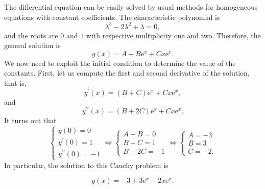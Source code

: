 \documentclass[a4paper,10 pt]{report}
\newcommand{\finalanswer}[1]{%
    \begin{finalAnswer}
    \[
        #1
    \]
    \end{finalAnswer}
}
\theoremstyle{definition}
\begin{document}
\begin{solutionBox} The differential equation can be easily solved by usual methods for homogeneous equations with constant coefficients. The characteristic polynomial is
\begin{equation*}\lambda^3 - 2 \lambda^2 + \lambda = 0, \end{equation*}
and the roots are $0$ and $1$ with respective multiplicity one and two. Therefore, the general solution is
\begin{equation*}y(x) = A + B\mathrm{e}^x + C x \mathrm{e}^x. \end{equation*}
We now need to exploit the initial condition to determine the value of the constants. First, let us compute the first and second derivative of the solution, that is,
\begin{equation*}y^\prime(x) = (B + C)\mathrm{e}^x + C x \mathrm{e}^x, \end{equation*}
and
\begin{equation*}y^{\prime \prime}(x) = (B + 2C) \mathrm{e}^x + C x \mathrm{e}^x. \end{equation*}
It turns out that
\begin{equation*} \begin{cases} y(0) = 0 \\ y^\prime(0) = 1 \\ y^{\prime \prime}(0) = - 1 \end{cases} \iff \begin{cases} A + B = 0 \\ B + C = 1 \\ B + 2C = - 1 \end{cases} \iff \begin{cases} A = -3 \\ B = 3 \\ C = - 2. \end{cases} \end{equation*}
In particular, the solution to this Cauchy problem is
\finalanswer{
y(x) = - 3 + 3 \mathrm{e}^x - 2x \mathrm{e}^x.
}
\end{solutionBox}

\nocite{*}


\end{document}
